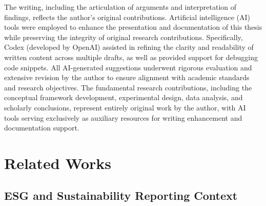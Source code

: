 \documentclass[english, online, cse, master]{dithesis}
\begin{document}
The writing, including the articulation of arguments and interpretation of findings, reflects the author’s original contributions. Artificial intelligence (AI) tools were employed to enhance the presentation and documentation of this thesis while preserving the integrity of original research
contributions. Specifically, Codex (developed by OpenAI) assisted in refining the clarity
and readability of written content across multiple drafts, as well as provided support for debugging code snippets. All AI-generated suggestions underwent rigorous evaluation and extensive revision by the author to ensure alignment with academic standards and research objectives. The fundamental research contributions, including the conceptual framework development, experimental design, data analysis, and scholarly conclusions, represent entirely original work by the author, with AI tools serving exclusively as auxiliary resources for writing enhancement and documentation support.































































 

\chapter{Related Works}
  \label{relatedwork}
  \section{ESG and Sustainability Reporting Context}
\end{document}
